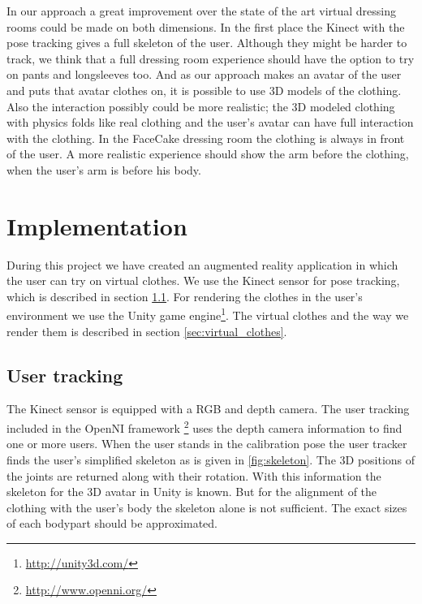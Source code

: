 \documentclass[a4paper]{article}
\begin{document}
In our approach a great improvement over the state of the art virtual dressing rooms could be made on both dimensions. In the first place the Kinect with the pose tracking gives a full skeleton of the user. Although they might be harder to track, we think that a full dressing room experience should have the option to try on pants and longsleeves too. And as our approach makes an avatar of the user and puts that avatar clothes on, it is possible to use 3D models of the clothing. Also the interaction possibly could be more realistic; the 3D modeled clothing with physics folds like real clothing and the user's avatar can have full interaction with the clothing.
In the FaceCake dressing room the clothing is always in front of the user. A more realistic experience should show the arm before the clothing, when the user's arm is before his body.

\section{Implementation}
\label{sec:implementation}

During this project we have created an augmented reality application in which the user can try on virtual clothes. We use the Kinect sensor for pose tracking, which is described in section \ref{sec:user_tracking}. For rendering the clothes in the user's environment we use the Unity game engine\footnote{\url{http://unity3d.com/}}. The virtual clothes and the way we render them is described in section \ref{sec:virtual_clothes}.

\subsection{User tracking}
\label{sec:user_tracking}

The Kinect sensor is equipped with a RGB and depth camera. The user tracking included in the OpenNI framework \footnote{\url{http://www.openni.org/}} uses the depth camera information to find one or more users. When the user stands in the calibration pose the user tracker finds the user's simplified skeleton as is given in \ref{fig:skeleton}. The 3D positions of the joints are returned along with their rotation. With this information the skeleton for the 3D avatar in Unity is known. But for the alignment of the clothing with the user's body the skeleton alone is not sufficient. The exact sizes of each bodypart should be approximated.
\end{document}
